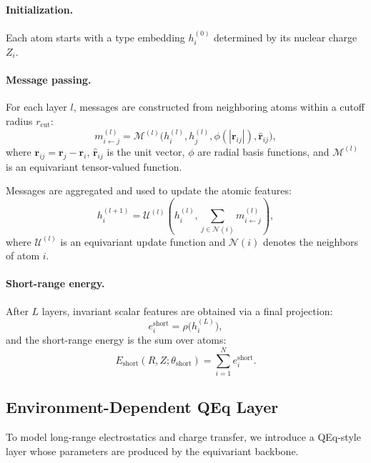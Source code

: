 \documentclass{article}
\begin{document}
\paragraph{Initialization.}
Each atom starts with a type embedding $h_i^{(0)}$ determined by its nuclear charge $Z_i$.

\paragraph{Message passing.}
For each layer $l$, messages are constructed from neighboring atoms within a cutoff radius $r_{\text{cut}}$:
\begin{equation}
    m_{i \leftarrow j}^{(l)} = \mathcal{M}^{(l)}\big(h_i^{(l)}, h_j^{(l)}, \phi(|\mathbf{r}_{ij}|), \hat{\mathbf{r}}_{ij}\big),
\end{equation}
where $\mathbf{r}_{ij} = \mathbf{r}_j - \mathbf{r}_i$, $\hat{\mathbf{r}}_{ij}$ is the unit vector, $\phi$ are radial basis functions, and $\mathcal{M}^{(l)}$ is an equivariant tensor-valued function.

Messages are aggregated and used to update the atomic features:
\begin{equation}
    h_i^{(l+1)} = \mathcal{U}^{(l)}\left(h_i^{(l)}, \sum_{j \in \mathcal{N}(i)} m_{i \leftarrow j}^{(l)}\right),
\end{equation}
where $\mathcal{U}^{(l)}$ is an equivariant update function and $\mathcal{N}(i)$ denotes the neighbors of atom $i$.

\paragraph{Short-range energy.}
After $L$ layers, invariant scalar features are obtained via a final projection:
\begin{equation}
    e_i^{\text{short}} = \rho\big(h_i^{(L)}\big),
\end{equation}
and the short-range energy is the sum over atoms:
\begin{equation}
    E_{\text{short}}(R, Z; \theta_{\text{short}}) = \sum_{i=1}^{N} e_i^{\text{short}}.
\end{equation}

\subsection{Environment-Dependent QEq Layer}

To model long-range electrostatics and charge transfer, we introduce a QEq-style layer whose parameters are produced by the equivariant backbone.
\end{document}
